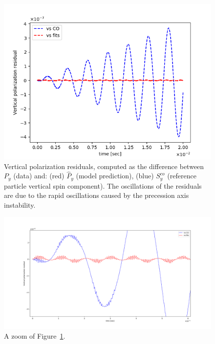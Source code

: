 \documentclass{article}
\begin{document}
\begin{figure}[!h]
  \centering
  \includegraphics[width=\linewidth]{img/spin_axis_motion/long/CW_LONG_double_res_full}
  \caption{Vertical polarization residuals, computed as the difference between $P_y$ (data) and: (red) $\hat P_y$ (model prediction), (blue) $S_y^{co}$ (reference particle vertical spin component). The oscillations of the residuals are due to the rapid oscillations caused by the precession axis instability.\label{fig:Py_fit_residual_full}}
\end{figure}
\begin{figure}[!h]
  \centering
  \includegraphics[width=\linewidth]{img/spin_axis_motion/long/CW_LONG_double_res_cut}
  \caption{A zoom of Figure~\ref{fig:Py_fit_residual_full}.\label{fig:Py_fit_residual_cut}}
\end{figure}
\end{document}
